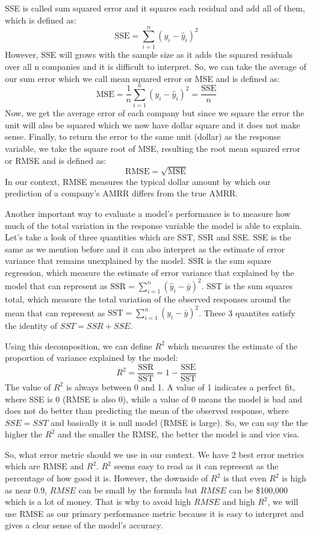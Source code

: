 \documentclass[12pt]{article}
\begin{document}
SSE is called sum squared error and it squares each residual and add all of them, which is defined as: 
\[
\text{SSE} = \sum_{i=1}^n (y_i - \hat{y}_i)^2
\]
However, SSE will grows with the sample size as it adds the squared residuals over all n companies and it is difficult to interpret. So, we can take the average of our sum error which we call mean squared error or MSE and is defined as:
\[
\text{MSE} = \frac{1}{n} \sum_{i=1}^n (y_i - \hat{y}_i)^2 = \frac{\text{SSE}}{n}
\]
Now, we get the average error of each company but since we square the error the unit will also be squared which we now have dollar square and it does not make sense. Finally, to return the error to the same unit (dollar) as the response variable, we take the square root of MSE, resulting the root mean squared error or RMSE and is defined as:
\[
\text{RMSE} = \sqrt{\text{MSE}}
\]
In our context, RMSE measures the typical dollar amount by which our prediction of a company's AMRR differs from the true AMRR. 

Another important way to evaluate a model's performance is to measure how much of the total variation in the response variable the model is able to explain. Let's take a look of three quantities which are SST, SSR and SSE. SSE is the same as we mention before and it can also interpret as the estimate of error variance that remains unexplained by the model. SSR is the sum square regression, which measure the estimate of error variance that explained by the model that can represent as \(\text{SSR} = \sum_{i=1}^n (\hat{y}_i - \bar{y})^2\). SST is the sum squares total, which measure the total variation of the observed responses around the mean that can represent as \(\text{SST} = \sum_{i=1}^n (y_i - \bar{y})^2\). These 3 quantites satisfy the identity of $SST = SSR + SSE$.

Using this decomposition, we can define $R^2$  which measures the estimate of the proportion of variance explained by the model:
\[
R^2 = \frac{\text{SSR}}{\text{SST}} = 1 - \frac{\text{SSE}}{\text{SST}}
\]
The value of $R^2$ is always between 0 and 1. A value of 1 indicates a perfect fit, where SSE is 0 (RMSE is also 0), while a value of 0 means the model is bad and does not do better than predicting the mean of the observed response, where $SSE = SST$ and basically it is null model (RMSE is large). So, we can say the the higher the $R^2$ and the smaller the RMSE, the better the model is and vice visa. 


So, what error metric should we use in our context. We have 2 best error metrics which are RMSE and $R^2$. $R^2$ seems easy to read as it can represent as the percentage of how good it is. However, the downside of $R^2$ is that even $R^2$ is high as near 0.9, $RMSE$ can be small by the formula but $RMSE$ can be \$100,000 which is a lot of money. That is why to avoid high $RMSE$ and high $R^2$, we will use RMSE as our primary performance metric because it is easy to interpret and gives a clear sense of the model's accuracy.
\end{document}
